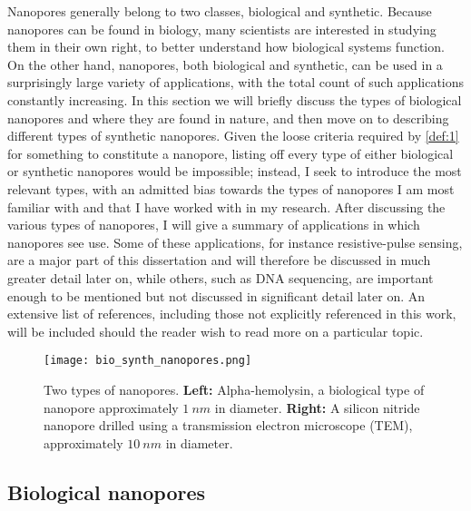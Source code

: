 		Nanopores generally belong to two classes, biological and synthetic. Because nanopores can be found in biology, many scientists are interested in studying them in their own right, to better understand how biological systems function. On the other hand, nanopores, both biological and synthetic, can be used in a surprisingly large variety of applications, with the total count of such applications constantly increasing. In this section we will briefly discuss the types of biological nanopores and where they are found in nature, and then move on to describing different types of synthetic nanopores. Given the loose criteria required by \ref{def:1} for something to constitute a nanopore, listing off every type of either biological or synthetic nanopores would be impossible; instead, I seek to introduce the most relevant types, with an admitted bias towards the types of nanopores I am most familiar with and that I have worked with in my research. After discussing the various types of nanopores, I will give a summary of applications in which nanopores see use. Some of these applications, for instance resistive-pulse sensing, are a major part of this dissertation and will therefore be discussed in much greater detail later on, while others, such as DNA sequencing, are important enough to be mentioned but not discussed in significant detail later on. An extensive list of references, including those not explicitly referenced in this work, will be included should the reader wish to read more on a particular topic.

		\begin{figure}[h]
			\texttt{[image: bio\_synth\_nanopores.png]}
			\caption{Two types of nanopores. \textbf{Left:} Alpha-hemolysin, a biological type of nanopore approximately $\SI{1}{nm}$ in diameter. \textbf{Right:} A silicon nitride nanopore drilled using a transmission electron microscope (TEM), approximately $\SI{10}{nm}$ in diameter.}
		\end{figure}

		\subsection{Biological nanopores}

